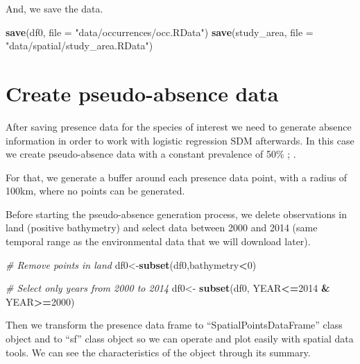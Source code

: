 \documentclass[
]{book}
\newenvironment{Shaded}{\begin{snugshade}}{\end{snugshade}}
\newcommand{\AttributeTok}[1]{\textcolor[rgb]{0.13,0.29,0.53}{#1}}
\newcommand{\CommentTok}[1]{\textcolor[rgb]{0.56,0.35,0.01}{\textit{#1}}}
\newcommand{\DecValTok}[1]{\textcolor[rgb]{0.00,0.00,0.81}{#1}}
\newcommand{\FunctionTok}[1]{\textcolor[rgb]{0.13,0.29,0.53}{\textbf{#1}}}
\newcommand{\NormalTok}[1]{#1}
\newcommand{\OtherTok}[1]{\textcolor[rgb]{0.56,0.35,0.01}{#1}}
\newcommand{\SpecialCharTok}[1]{\textcolor[rgb]{0.81,0.36,0.00}{\textbf{#1}}}
\newcommand{\StringTok}[1]{\textcolor[rgb]{0.31,0.60,0.02}{#1}}
\begin{document}
And, we save the data.

\begin{Shaded}
\begin{Highlighting}[]
\FunctionTok{save}\NormalTok{(df0, }\AttributeTok{file =} \StringTok{"data/occurrences/occ.RData"}\NormalTok{)}
\FunctionTok{save}\NormalTok{(study\_area, }\AttributeTok{file =} \StringTok{"data/spatial/study\_area.RData"}\NormalTok{)}
\end{Highlighting}
\end{Shaded}

\section{Create pseudo-absence data}\label{create-pseudo-absence-data}

After saving presence data for the species of interest we need to generate absence information in order to work with logistic regression SDM afterwards. In this case we create pseudo-absence data with a constant prevalence of 50\% \citep{mcpherson_2004}; \citep{barbetmassin_etal_2012}.

For that, we generate a buffer around each presence data point, with a radius of 100km, where no points can be generated.

Before starting the pseudo-absence generation process, we delete observations in land (positive bathymetry) and select data between 2000 and 2014 (same temporal range as the environmental data that we will download later).

\begin{Shaded}
\begin{Highlighting}[]
\CommentTok{\# Remove points in land}
\NormalTok{df0}\OtherTok{\textless{}{-}}\FunctionTok{subset}\NormalTok{(df0,bathymetry}\SpecialCharTok{\textless{}}\DecValTok{0}\NormalTok{)}

\CommentTok{\# Select only years from 2000 to 2014}
\NormalTok{df0}\OtherTok{\textless{}{-}} \FunctionTok{subset}\NormalTok{(df0, YEAR}\SpecialCharTok{\textless{}=}\DecValTok{2014} \SpecialCharTok{\&}\NormalTok{ YEAR}\SpecialCharTok{\textgreater{}=}\DecValTok{2000}\NormalTok{)}
\end{Highlighting}
\end{Shaded}

Then we transform the presence data frame to ``SpatialPointsDataFrame'' class object and to ``sf'' class object so we can operate and plot easily with spatial data tools. We can see the characteristics of the object through its summary.
\end{document}
